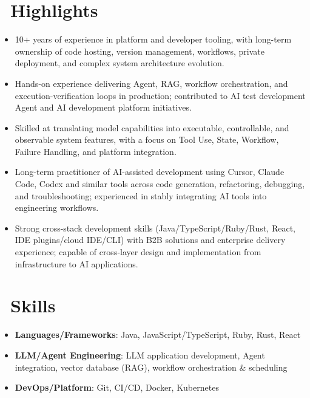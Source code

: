\documentclass{resume}
\begin{document}



\section{\faStar\ Highlights}
\begin{itemize}[parsep=0.5ex]
  \item 10+ years of experience in platform and developer tooling, with long-term ownership of code hosting, version management, workflows, private deployment, and complex system architecture evolution.
  \item Hands-on experience delivering Agent, RAG, workflow orchestration, and execution-verification loops in production; contributed to AI test development Agent and AI development platform initiatives.
  \item Skilled at translating model capabilities into executable, controllable, and observable system features, with a focus on Tool Use, State, Workflow, Failure Handling, and platform integration.
  \item Long-term practitioner of AI-assisted development using Cursor, Claude Code, Codex and similar tools across code generation, refactoring, debugging, and troubleshooting; experienced in stably integrating AI tools into engineering workflows.
  \item Strong cross-stack development skills (Java/TypeScript/Ruby/Rust, React, IDE plugins/cloud IDE/CLI) with B2B solutions and enterprise delivery experience; capable of cross-layer design and implementation from infrastructure to AI applications.
\end{itemize}

\section{\faCogs\ Skills}
\begin{itemize}[parsep=0.5ex]
  \item \textbf{Languages/Frameworks}: Java, JavaScript/TypeScript, Ruby, Rust, React
  \item \textbf{LLM/Agent Engineering}: LLM application development, Agent integration, vector database (RAG), workflow orchestration \& scheduling
  \item \textbf{DevOps/Platform}: Git, CI/CD, Docker, Kubernetes
\end{itemize}
\end{document}
